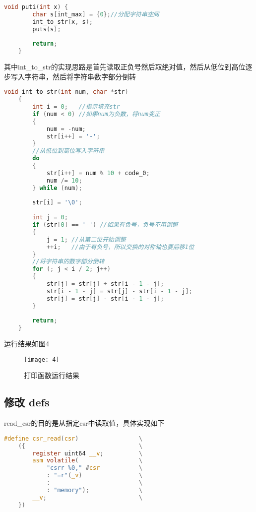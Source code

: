 \documentclass{source/Report}
\begin{document}
\begin{lstlisting}[language = c, title = {puti}]
    void puti(int x) {
        char s[int_max] = {0};//分配字符串空间
        int_to_str(x, s);
        puts(s);
    
        return;
    }
\end{lstlisting}

其中int\_to\_str的实现思路是首先读取正负号然后取绝对值，然后从低位到高位逐步写入字符串，然后将字符串数字部分倒转

\begin{lstlisting}[language = c, title = {int转char}]
    void int_to_str(int num, char *str)
    {
        int i = 0;   //指示填充str
        if (num < 0) //如果num为负数，将num变正
        {
            num = -num;
            str[i++] = '-';
        }
        //从低位到高位写入字符串
        do
        {
            str[i++] = num % 10 + code_0;
            num /= 10;                
        } while (num);               
    
        str[i] = '\0';
    
        int j = 0;
        if (str[0] == '-') //如果有负号，负号不用调整
        {
            j = 1; //从第二位开始调整
            ++i;   //由于有负号，所以交换的对称轴也要后移1位
        }
        //将字符串的数字部分倒转
        for (; j < i / 2; j++)
        {
            str[j] = str[j] + str[i - 1 - j];
            str[i - 1 - j] = str[j] - str[i - 1 - j];
            str[j] = str[j] - str[i - 1 - j];
        }
    
        return;
    }
\end{lstlisting}

运行结果如图4

\begin{figure}[p]
    \centering
    \texttt{[image: 4]}
    \caption{打印函数运行结果}
\end{figure}

\subsection{修改 defs}

read\_csr的目的是从指定csr中读取值，具体实现如下

\begin{lstlisting}[language = c, title = {csr宏}]
#define csr_read(csr)                 \
    ({                                \
        register uint64 __v;          \
        asm volatile(                 \
            "csrr %0," #csr           \
            : "=r"(_v)                \
            :                         \
            : "memory");              \
        __v;                          \
    })
\end{lstlisting}
\end{document}
